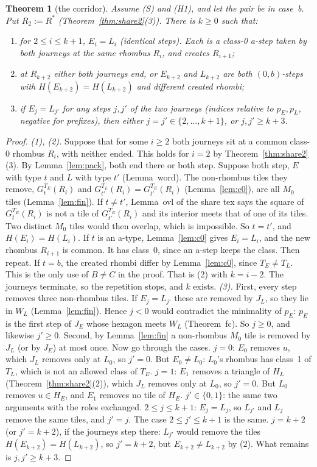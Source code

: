 \documentclass[11pt]{article}
\newtheorem{theorem}{Theorem}\newtheorem{lemma}[theorem]{Lemma}\newtheorem{proposition}[theorem]{Proposition}
\theoremstyle{definition}\newtheorem{definition}[theorem]{Definition}\newtheorem{remark}[theorem]{Remark}
\begin{document}
\begin{theorem}[the corridor]\label{thm:corr}
Assume (S) and (H1), and let the pair be in case~b. Put $R_2:=R^*$ (Theorem~\ref{thm:share2}(3)). There is $k\ge0$ such that:
\begin{enumerate}
\item for $2\le i\le k+1$, $E_i=L_i$ (identical steps). Each is a class-0 a-step taken by both journeys at the same rhombus $R_i$, and creates $R_{i+1}$;
\item at $R_{k+2}$ either both journeys end, or $E_{k+2}$ and $L_{k+2}$ are both $(0,b)$-steps with $H(E_{k+2})=H(L_{k+2})$ and different created rhombi;
\item if $E_j=L_{j'}$ for any steps $j,j'$ of the two journeys (indices relative to $p_E,p_L$, negative for prefixes), then either $j=j'\in\{2,\dots,k+1\}$, or $j,j'\ge k+3$.
\end{enumerate}
\end{theorem}
\begin{proof}
\emph{(1), (2).} Suppose that for some $i\ge2$ both journeys sit at a common class-0 rhombus $R_i$, with neither ended. This holds for $i=2$ by Theorem~\ref{thm:share2}(3). By Lemma~\ref{lem:pack}, both end there or both step. Suppose both step, $E$ with type $t$ and $L$ with type $t'$ (Lemma~word). The non-rhombus tiles they remove, $G^{T_E}_t(R_i)$ and $G^{T_L}_{t'}(R_i)=G^{T_E}_{t'}(R_i)$ (Lemma~\ref{lem:c0}), are all $M_0$ tiles (Lemma~\ref{lem:fin}). If $t\ne t'$, Lemma~ovl of the share tex says the square of $G^{T_E}_t(R_i)$ is not a tile of $G^{T_E}_{t'}(R_i)$ and its interior meets that of one of its tiles. Two distinct $M_0$ tiles would then overlap, which is impossible. So $t=t'$, and $H(E_i)=H(L_i)$. If $t$ is an a-type, Lemma~\ref{lem:c0} gives $E_i=L_i$, and the new rhombus $R_{i+1}$ is common. It has class~0, since an a-step keeps the class. Then repeat. If $t=b$, the created rhombi differ by Lemma~\ref{lem:c0}, since $T_E\neq T_L$. This is the only use of $B\neq C$ in the proof. That is (2) with $k=i-2$. The journeys terminate, so the repetition stops, and $k$ exists.
\emph{(3).} First, every step removes three non-rhombus tiles. If $E_j=L_{j'}$ these are removed by $J_L$, so they lie in $W_L$ (Lemma~\ref{lem:fin}). Hence $j<0$ would contradict the minimality of $p_E$: $p_E$ is the first step of $J_E$ whose hexagon meets $W_L$ (Theorem~fc). So $j\ge0$, and likewise $j'\ge0$. Second, by Lemma~\ref{lem:fin} a non-rhombus $M_0$ tile is removed by $J_L$ (or by $J_E$) at most once. Now go through the cases.
$j=0$: $E_0$ removes $u$, which $J_L$ removes only at $L_0$, so $j'=0$. But $E_0\ne L_0$: $L_0$'s rhombus has class~1 of $T_L$, which is not an allowed class of $T_E$.
$j=1$: $E_1$ removes a triangle of $H_L$ (Theorem~\ref{thm:share2}(2)), which $J_L$ removes only at $L_0$, so $j'=0$. But $L_0$ removes $u\in H_E$, and $E_1$ removes no tile of $H_E$.
$j'\in\{0,1\}$: the same two arguments with the roles exchanged.
$2\le j\le k+1$: $E_j=L_j$, so $L_{j'}$ and $L_j$ remove the same tiles, and $j'=j$. The case $2\le j'\le k+1$ is the same.
$j=k+2$ (or $j'=k+2$), if the journeys step there: $L_{j'}$ would remove the tiles $H(E_{k+2})=H(L_{k+2})$, so $j'=k+2$, but $E_{k+2}\ne L_{k+2}$ by (2).
What remains is $j,j'\ge k+3$.
\end{proof}
\end{document}
